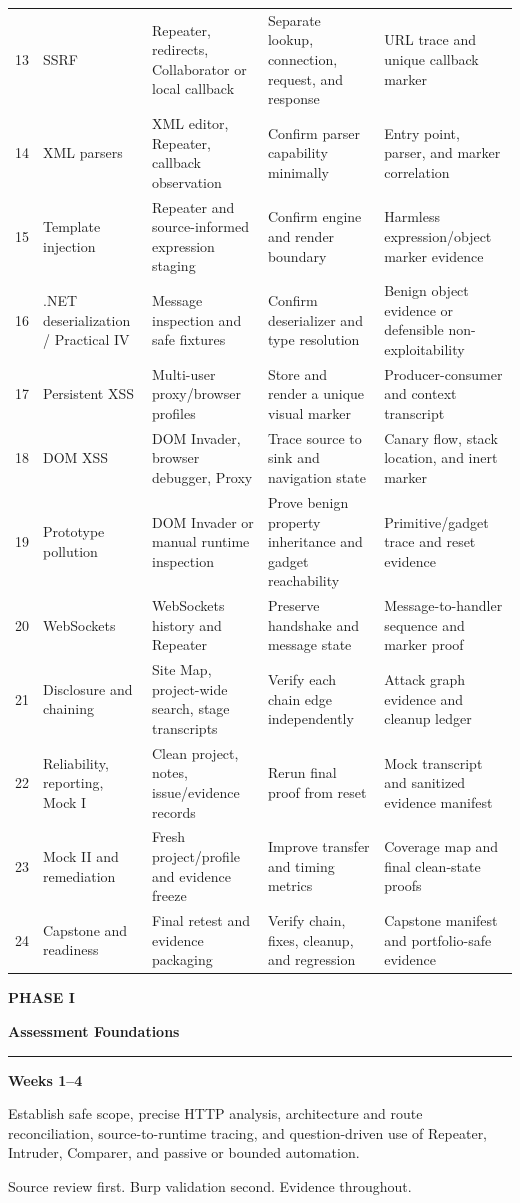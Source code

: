 \documentclass[11pt]{article}
\newcommand{\phasepage}[4]{%
  \clearpage
  \thispagestyle{empty}
  \addcontentsline{toc}{section}{Phase #1 -- #2}
  \vspace*{0.14\textheight}
  {\sffamily\bfseries\fontsize{16}{20}\selectfont\color{Gold} PHASE #1\par}
  \vspace{0.2cm}
  {\sffamily\bfseries\fontsize{27}{32}\selectfont\color{Navy}#2\par}
  \vspace{0.4cm}
  {\color{Teal}\rule{0.48\textwidth}{2pt}}\par
  \vspace{0.8cm}
  \begin{tcolorbox}[colback=Navy,colframe=Navy,coltext=white,boxrule=0.8pt]
    \sffamily\large\textbf{Weeks #3}
  \end{tcolorbox}
  \vspace{0.35cm}
  \begin{tcolorbox}[colback=Mist,colframe=Teal,title=Phase outcome]
    #4
  \end{tcolorbox}
  \vfill
  {\sffamily\small\color{TextGray}Source review first. Burp validation second. Evidence throughout.\par}
}
\begin{document}
\begin{longtable}{@{}C{0.035\textwidth}L{0.19\textwidth}L{0.20\textwidth}L{0.19\textwidth}L{0.27\textwidth}@{}}
13 & SSRF & Repeater, redirects, Collaborator or local callback & Separate lookup, connection, request, and response & URL trace and unique callback marker \\
14 & XML parsers & XML editor, Repeater, callback observation & Confirm parser capability minimally & Entry point, parser, and marker correlation \\
15 & Template injection & Repeater and source-informed expression staging & Confirm engine and render boundary & Harmless expression/object marker evidence \\
16 & .NET deserialization / Practical IV & Message inspection and safe fixtures & Confirm deserializer and type resolution & Benign object evidence or defensible non-exploitability \\
17 & Persistent XSS & Multi-user proxy/browser profiles & Store and render a unique visual marker & Producer-consumer and context transcript \\
18 & DOM XSS & DOM Invader, browser debugger, Proxy & Trace source to sink and navigation state & Canary flow, stack location, and inert marker \\
19 & Prototype pollution & DOM Invader or manual runtime inspection & Prove benign property inheritance and gadget reachability & Primitive/gadget trace and reset evidence \\
20 & WebSockets & WebSockets history and Repeater & Preserve handshake and message state & Message-to-handler sequence and marker proof \\
21 & Disclosure and chaining & Site Map, project-wide search, stage transcripts & Verify each chain edge independently & Attack graph evidence and cleanup ledger \\
22 & Reliability, reporting, Mock I & Clean project, notes, issue/evidence records & Rerun final proof from reset & Mock transcript and sanitized evidence manifest \\
23 & Mock II and remediation & Fresh project/profile and evidence freeze & Improve transfer and timing metrics & Coverage map and final clean-state proofs \\
24 & Capstone and readiness & Final retest and evidence packaging & Verify chain, fixes, cleanup, and regression & Capstone manifest and portfolio-safe evidence \\
\bottomrule
\end{longtable}
\normalsize
\phasepage{I}{Assessment Foundations}{1--4}{Establish safe scope, precise HTTP
analysis, architecture and route reconciliation, source-to-runtime tracing, and
question-driven use of Repeater, Intruder, Comparer, and passive or bounded
automation.}
\end{document}
